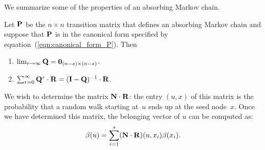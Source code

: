 We summarize some of the properties of an absorbing Markov chain. 
\begin{proposition}\label{prop:limiting_Q}
	Let $\mathbf{P}$ be the $n \times n$ transition matrix that defines an absorbing Markov chain
	and suppose that $\mathbf{P}$ is in the canonical form specified by equation~(\ref{eqn:canonical_form_P}). 
	Then
	\begin{enumerate}
		\item $\lim_{r \to \infty} \mathbf{Q} = \mathbf{0}_{(n - s) \times (n - s)}$.
		\item $\sum_{r = 0}^{\infty} \mathbf{Q}^r \cdot \mathbf{R} = (\mathbf{I} - \mathbf{Q})^{-1} \cdot \mathbf{R}$.
	\end{enumerate} 
\end{proposition}

We wish to determine the matrix $\mathbf{N} \cdot \mathbf{R}$: the entry $(u, x)$ of this 
matrix is the probability that a random walk starting at~$u$ ends up at the seed 
node~$x$. Once we have determined this matrix, the belonging vector of $u$ can 
be computed as:
\begin{equation}\label{eqn:belonging_vector}
	\beta(u) = \sum_{i = 1}^{s} (\mathbf{N} \cdot \mathbf{R}) (u, x_i) \beta(x_i).
\end{equation}


